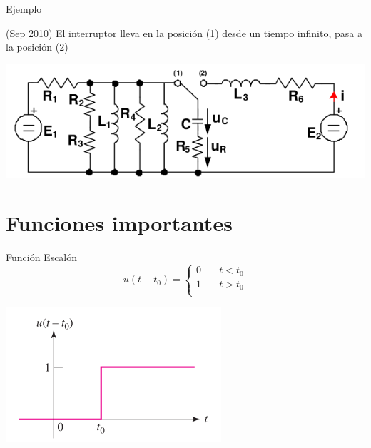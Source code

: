 \documentclass[xcolor={usenames,svgnames,dvipsnames}]{beamer}
\begin{document}
\begin{frame}[label={sec:org1755650}]{Ejemplo}
\begin{block}{(Sep 2010) El interruptor lleva en la posición (1) desde un tiempo infinito, pasa a la posición (2)}
\begin{center}
\includegraphics[width=.9\linewidth]{../figs/ejemplo_condiciones_iniciales.pdf}
\end{center}
\end{block}
\end{frame}

\section{Funciones importantes}
\label{sec:orgda71b82}
\begin{frame}[label={sec:orgcbc688f}]{Función Escalón}
\[   
u(t - t_0) = 
     \begin{cases}
       0 &\quad t < t_0\\
       1 &\quad t > t_0\\
     \end{cases}
\]
\begin{center}
\includegraphics[width=.9\linewidth]{../figs/funcion_escalon.pdf}
\end{center}
\end{frame}
\end{document}
